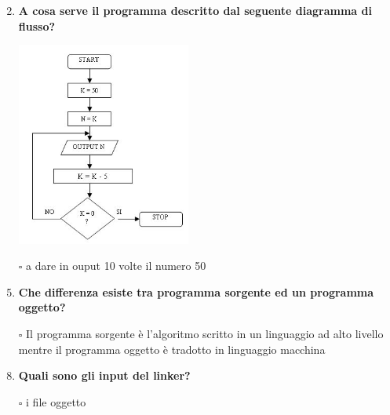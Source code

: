 \documentclass[11pt]{article}
\begin{document}
\begin{enumerate}
\item [\nonumber]
\item {\bf A cosa serve il programma descritto dal seguente diagramma di flusso?}
\begin{center}
\includegraphics[width=0.45\textwidth]{mm4_fig5.jpg}
\end{center}

\item[$\square$]a dare in ouput 10 volte il numero 50


\item [\nonumber]
\item {\bf Che differenza esiste tra programma sorgente  ed un programma oggetto?}

\item[$\square$]Il programma sorgente \`{e} l'algoritmo scritto in un linguaggio ad alto livello mentre il programma oggetto \`{e} tradotto in linguaggio macchina
\

\item [\nonumber]
\item {\bf Quali sono gli input del linker?}
\item[$\square$] i file oggetto


\end{enumerate}



 
\end{document}
